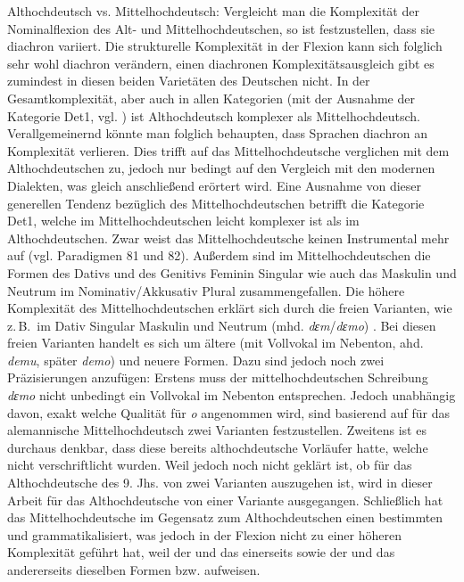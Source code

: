 {Althochdeutsch vs. Mittelhochdeutsch:} Vergleicht man die Komplexität der Nominalflexion des Alt- und Mittelhochdeutschen, so ist festzustellen, dass sie diachron variiert. Die strukturelle Komplexität in der Flexion kann sich folglich sehr wohl diachron verändern, einen diachronen Komplexitätsausgleich gibt es zumindest in diesen beiden Varietäten des Deutschen nicht. In der Gesamtkomplexität, aber auch in allen Kategorien (mit der Ausnahme der Kategorie Det1, vgl. ) ist Althochdeutsch komplexer als Mittelhochdeutsch. Verallgemeinernd könnte man folglich behaupten, dass Sprachen diachron an Komplexität verlieren. Dies trifft auf das Mittelhochdeutsche verglichen mit dem Althochdeutschen zu, jedoch nur bedingt auf den Vergleich mit den modernen Dialekten, was gleich anschließend erörtert wird. Eine Ausnahme von dieser generellen Tendenz bezüglich des Mittelhochdeutschen betrifft die Kategorie Det1, welche im Mittelhochdeutschen leicht komplexer ist als im Althochdeutschen. Zwar weist das Mittelhochdeutsche keinen Instrumental mehr auf (vgl. Paradigmen 81 und 82). Außerdem sind im Mittelhochdeutschen die Formen des Dativs und des Genitivs Feminin Singular wie auch das Maskulin und Neutrum im Nominativ/Akkusativ Plural zusammengefallen. Die höhere Komplexität des Mittelhochdeutschen erklärt sich durch die freien Varianten, wie z.\,B.\ im Dativ Singular Maskulin und Neutrum (mhd. \textit{dɛm}/\textit{dɛmo}) \citep[218]{Paul2007}. Bei diesen freien Varianten handelt es sich um ältere (mit Vollvokal im Nebenton, ahd. \textit{demu}, später \textit{demo}) \citep[247]{Braune2004} und neuere Formen. Dazu sind jedoch noch zwei Präzisierungen anzufügen: Erstens muss der mittelhochdeutschen Schreibung \textit{dɛmo} nicht unbedingt ein Vollvokal im Nebenton entsprechen. Jedoch unabhängig davon, exakt welche Qualität für \textit{o} angenommen wird, sind basierend auf \citet{Paul2007} für das alemannische Mittelhochdeutsch zwei Varianten festzustellen. Zweitens ist es durchaus denkbar, dass diese  bereits althochdeutsche Vorläufer hatte, welche nicht verschriftlicht wurden. Weil jedoch noch nicht geklärt ist, ob für das Althochdeutsche des 9. Jhs. von zwei Varianten auszugehen ist, wird in dieser Arbeit für das Althochdeutsche von einer Variante ausgegangen. Schließlich hat das Mittelhochdeutsche im Gegensatz zum Althochdeutschen einen bestimmten und  grammatikalisiert, was jedoch in der Flexion nicht zu einer höheren Komplexität geführt hat, weil der  und das  einerseits sowie der  und das  andererseits dieselben Formen bzw.  aufweisen.

